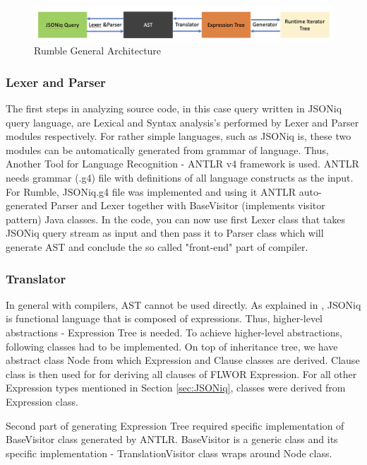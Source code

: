 \begin{figure}[h!]
	\includegraphics[width=\linewidth]{parsing_architecture.png}
	\vspace*{-5mm}
	\caption{Rumble General Architecture}
	\label{fig:Rumble_General_Architecture}
\end{figure}

\subsubsection{Lexer and Parser}
\label{sec:RumbleLexerParser}
The first steps in analyzing source code, in this case query written in JSONiq query language, are Lexical and Syntax analysis's performed by Lexer and Parser modules respectively. For rather simple languages, such as JSONiq is, these two modules can be automatically generated from grammar of language. Thus, Another Tool for Language Recognition - ANTLR v4 framework \cite{ANTLR} is used. ANTLR needs grammar (.g4) file with definitions of all language constructs as the input. For Rumble, JSONiq.g4 file was implemented and using it ANTLR auto-generated Parser and Lexer together with BaseVisitor (implements visitor pattern) Java classes. In the code, you can now use first Lexer class that takes JSONiq query stream as input and then pass it to Parser class which will generate AST and conclude the so called "front-end" part of compiler.

\subsubsection{Translator}
In general with compilers, AST cannot be used directly. As explained in \cite{RumbleMLThesis}, JSONiq is functional language that is composed of expressions. Thus, higher-level abstractions - Expression Tree is needed. To achieve higher-level abstractions, following classes had to be implemented. On top of inheritance tree, we have abstract class Node from which Expression and Clause classes are derived. Clause class is then used for for deriving all clauses of FLWOR Expression. For all other Expression types mentioned in Section \ref{sec:JSONiq}, classes were derived from Expression class. 

Second part of generating Expression Tree required specific implementation of BaseVisitor class generated by ANTLR. BaseVisitor is a generic class and its specific implementation - TranslationVisitor class wraps around Node class. 

